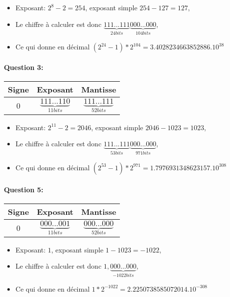 \begin{itemize}
 \item Exposant: $2^8-2=254$, exposant simple $254-127=127$,
 \item Le chiffre à calculer est donc $\underbrace{111...111}_{24 bits}\underbrace{000...000}_{104 bits}$,
 \item Ce qui donne en décimal $(2^{24}-1)*2^{104}=3.4028234663852886.10^{38}$
\end{itemize}

\paragraph{Question 3:}

\begin{center}
	\begin{tabular}{|c c c|}
	\hline
	Signe & Exposant & Mantisse \\
	\hline
	0 & $\underbrace{111...110}_{11 bits}$ & $\underbrace{111...111}_{52 bits}$ \\
	\hline
	\end{tabular}
\end{center}

\begin{itemize}
 \item Exposant: $2^{11}-2=2046$, exposant simple $2046-1023=1023$,
 \item Le chiffre à calculer est donc $\underbrace{111...111}_{53 bits}\underbrace{000...000}_{971 bits}$,
 \item Ce qui donne en décimal $(2^{53}-1)*2^{971}=1.7976931348623157.10^{308}$
\end{itemize}

\paragraph{Question 5:}

\begin{center}
	\begin{tabular}{|c c c|}
	\hline
	Signe & Exposant & Mantisse \\
	\hline
	0 & $\underbrace{000...001}_{11 bits}$ & $\underbrace{000...000}_{52 bits}$ \\
	\hline
	\end{tabular}
\end{center}

\begin{itemize}
 \item Exposant: $1$, exposant simple $1-1023=-1022$,
 \item Le chiffre à calculer est donc $1,\underbrace{000...000}_{-1022 bits}$,
 \item Ce qui donne en décimal $1*2^{-1022}=2.2250738585072014.10^{-308}$
\end{itemize}

